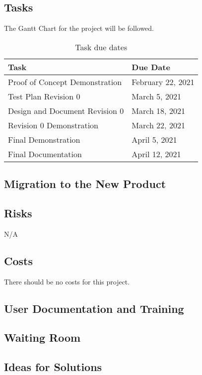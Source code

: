 \documentclass[12pt, titlepage]{article}
\begin{document}
\subsection{Tasks}
The Gantt Chart for the project will be followed.

\begin{table}[H]
\caption{Task due dates}
    \centering
    \begin{tabular}{ |p{7.5cm}|p{4.5cm}| }
    \hline
    \textbf{Task} & \textbf{Due Date} \\
    \hline
    Proof of Concept Demonstration & February 22, 2021 \\
    \hline
    Test Plan Revision 0 & March 5, 2021 \\
    \hline
    Design and Document Revision 0 & March 18, 2021 \\
    \hline
    Revision 0 Demonstration & March 22, 2021 \\
    \hline
    Final Demonstration & April 5, 2021 \\
    \hline
    Final Documentation & April 12, 2021 \\
    \hline
    \end{tabular}
\end{table}

\subsection{Migration to the New Product}

\subsection{Risks}
N/A
\subsection{Costs}
There should be no costs for this project.

\subsection{User Documentation and Training}

\subsection{Waiting Room}

\subsection{Ideas for Solutions}
\end{document}

